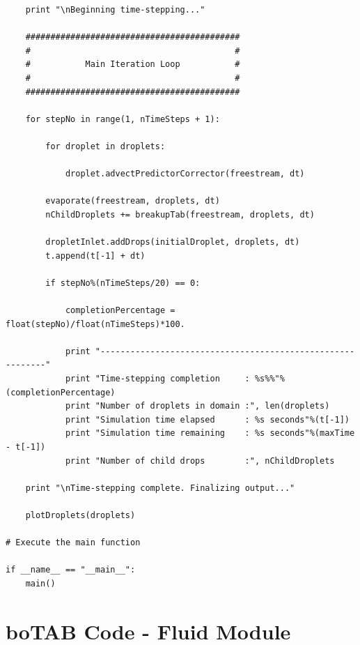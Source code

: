 \documentclass[12pt]{article}
\begin{document}
\begin{lstlisting}
    print "\nBeginning time-stepping..."

    ###########################################
    #                                         #
    #           Main Iteration Loop           #
    #                                         #
    ###########################################

    for stepNo in range(1, nTimeSteps + 1):

        for droplet in droplets:

            droplet.advectPredictorCorrector(freestream, dt)

        evaporate(freestream, droplets, dt)
        nChildDroplets += breakupTab(freestream, droplets, dt)

        dropletInlet.addDrops(initialDroplet, droplets, dt)
        t.append(t[-1] + dt)

        if stepNo%(nTimeSteps/20) == 0:

            completionPercentage = float(stepNo)/float(nTimeSteps)*100.

            print "-----------------------------------------------------------"
            print "Time-stepping completion     : %s%%"%(completionPercentage)
            print "Number of droplets in domain :", len(droplets)
            print "Simulation time elapsed      : %s seconds"%(t[-1])
            print "Simulation time remaining    : %s seconds"%(maxTime - t[-1])
            print "Number of child drops        :", nChildDroplets

    print "\nTime-stepping complete. Finalizing output..."

    plotDroplets(droplets)

# Execute the main function

if __name__ == "__main__":
    main()
\end{lstlisting}
\newpage
\section{boTAB Code - Fluid Module}
\end{document}
